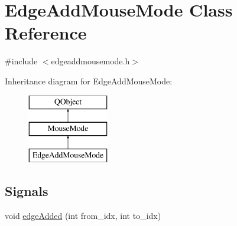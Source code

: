 \hypertarget{class_edge_add_mouse_mode}{}\section{Edge\+Add\+Mouse\+Mode Class Reference}
\label{class_edge_add_mouse_mode}


{\ttfamily \#include $<$edgeaddmousemode.\+h$>$}

Inheritance diagram for Edge\+Add\+Mouse\+Mode\+:\begin{figure}[H]
\begin{center}
\leavevmode
\includegraphics[height=3.000000cm]{d3/d57/class_edge_add_mouse_mode}
\end{center}
\end{figure}
\subsection*{Signals}
\begin{DoxyCompactItemize}
\item 
void \mbox{\hyperlink{class_edge_add_mouse_mode_a39e811c29fdaa5355b476c0ddfb6f57f}{edge\+Added}} (int from\+\_\+idx, int to\+\_\+idx)
\end{DoxyCompactItemize}
